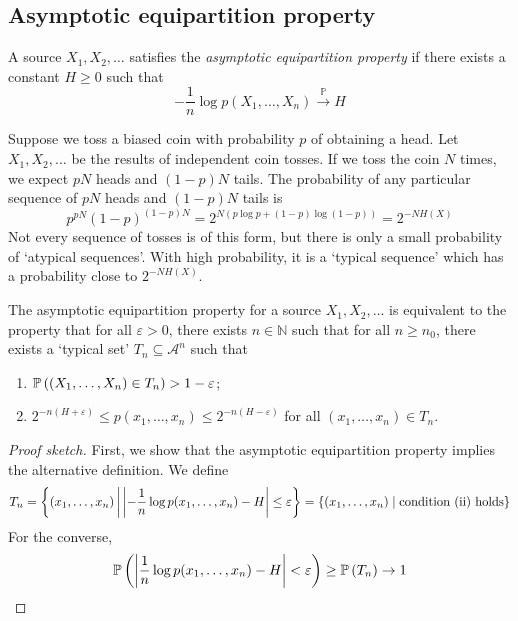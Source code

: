 \subsection{Asymptotic equipartition property}
\begin{definition}
    A source \( X_1, X_2, \dots \) satisfies the \emph{asymptotic equipartition property} if there exists a constant \( H \geq 0 \) such that
    \[ -\frac{1}{n} \log p(X_1, \dots, X_n) \xrightarrow{\mathbb P} H \]
\end{definition}
\begin{example}
    Suppose we toss a biased coin with probability \( p \) of obtaining a head.
    Let \( X_1, X_2, \dots \) be the results of independent coin tosses.
    If we toss the coin \( N \) times, we expect \( pN \) heads and \( (1-p)N \) tails.
    The probability of any particular sequence of \( pN \) heads and \( (1-p)N \) tails is
    \[ p^{pN} (1-p)^{(1-p)N} = 2^{N (p \log p + (1-p) \log(1-p))} = 2^{-NH(X)} \]
    Not every sequence of tosses is of this form, but there is only a small probability of `atypical sequences'.
    With high probability, it is a `typical sequence' which has a probability close to \( 2^{-NH(X)} \).
\end{example}
\begin{lemma}
    The asymptotic equipartition property for a source \( X_1, X_2, \dots \) is equivalent to the property that for all \( \varepsilon > 0 \), there exists \( n \in \mathbb N \) such that for all \( n \geq n_0 \), there exists a `typical set' \( T_n \subseteq \mathcal A^n \) such that
    \begin{enumerate}
        \item \( \mathbb{P}\left({(X_1, \dots, X_n) \in T_n}\right) > 1 - \varepsilon \);
        \item \( 2^{-n(H+\varepsilon)} \leq p(x_1, \dots, x_n) \leq 2^{-n(H-\varepsilon)} \) for all \( (x_1, \dots, x_n) \in T_n \).
    \end{enumerate}
\end{lemma}
\begin{proof}[Proof sketch]
    First, we show that the asymptotic equipartition property implies the alternative definition.
    We define
    \[ T_n = \qty{(x_1, \dots, x_n) \,\middle|\,\abs{-\frac{1}{n} \log p(x_1, \dots, x_n) - H} \leq \varepsilon} = \qty{(x_1, \dots, x_n) \mid \text{condition (ii) holds}} \]
    For the converse,
    \[ \mathbb{P}\left({\abs{\frac{1}{n}\log p(x_1, \dots, x_n) - H} < \varepsilon}\right) \geq \mathbb{P}\left({T_n}\right) \to 1 \]
\end{proof}

